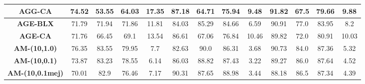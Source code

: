 \documentclass[11pt,a4paper]{article}
\begin{document}
\begin{table}[H]
{\begin{tabular}{c|c|c|c|c|c|c|c|c|c|c|c|c|}
\multicolumn{1}{|c|}{\textbf{AGG-CA}}                                                                & 74.52                      & 53.55                   & 64.03                  & 17.35             & 87.18                      & 64.71                   & 75.94                  & 9.48              & 91.82                      & 67.5                    & 79.66                  & 9.88             \\ \hline
\multicolumn{1}{|c|}{\textbf{AGE-BLX}}                                                               & 71.79                      & 71.94                   & 71.86                  & 11.81             & 84.03                      & 85.29                   & 84.66                  & 6.59              & 90.91                      & 77.0                    & 83.95                  & 8.2              \\ \hline
\multicolumn{1}{|c|}{\textbf{AGE-CA}}                                                                & 71.76                      & 66.45                   & 69.1                   & 13.54             & 86.61                      & 67.06                   & 76.84                  & 10.46             & 89.82                      & 72.0                    & 80.91                  & 10.03            \\ \hline
\multicolumn{1}{|c|}{\textbf{AM-(10,1.0)}}                                                           & 76.35                      & 83.55                   & 79.95                  & 7.7               & 82.63                      & 90.0                    & 86.31                  & 3.68              & 90.73                      & 84.0                    & 87.36                  & 5.32             \\ \hline
\multicolumn{1}{|c|}{\textbf{AM-(10,0.1)}}                                                           & 73.87                      & 83.23                   & 78.55                  & 6.14              & 86.03                      & 88.82                   & 87.43                  & 3.22              & 89.27                      & 86.0                    & 87.64                  & 4.52             \\ \hline
\multicolumn{1}{|c|}{\textbf{AM-(10,0.1mej)}}                                                        & 70.01                      & 82.9                    & 76.46                  & 7.17              & 90.31                      & 87.65                   & 88.98                  & 3.44              & 88.18                      & 86.5                    & 87.34                  & 4.39             \\ \hline

\end{tabular}}
\end{table}
\end{document}
